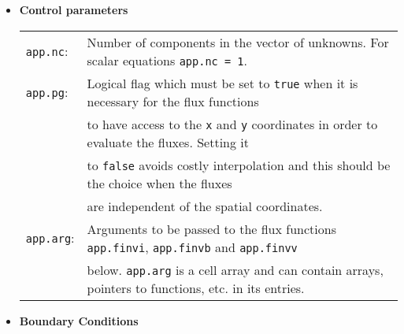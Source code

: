 \documentclass[11pt]{article}
\begin{document}
\begin{itemize}

\item {\bf Control parameters}

\bigskip

\begin{tabular}{|ll}
        \texttt{app.nc}: & Number of components in the vector of unknowns. For scalar equations \texttt{app.nc = 1}. 
            \\ 
	\texttt{app.pg}: & Logical flag which must be set to \texttt{true} when it is necessary for the flux functions  \\
	                         & to have access to the \texttt{x} and \texttt{y} coordinates in order to evaluate the fluxes. Setting it \\
	                         & to \texttt{false} avoids costly interpolation and this should be the choice when the fluxes \\
	                         & are independent of the spatial coordinates.
	                         \\
	 \texttt{app.arg}:  & Arguments to be passed to the flux functions \texttt{app.finvi}, \texttt{app.finvb} and \texttt{app.finvv} \\
	                           & below.  \texttt{app.arg} is a cell array and can contain arrays, pointers to functions, etc. in its entries.            
\end{tabular}


\item {\bf Boundary Conditions}

\bigskip


\end{itemize}
\end{document}
